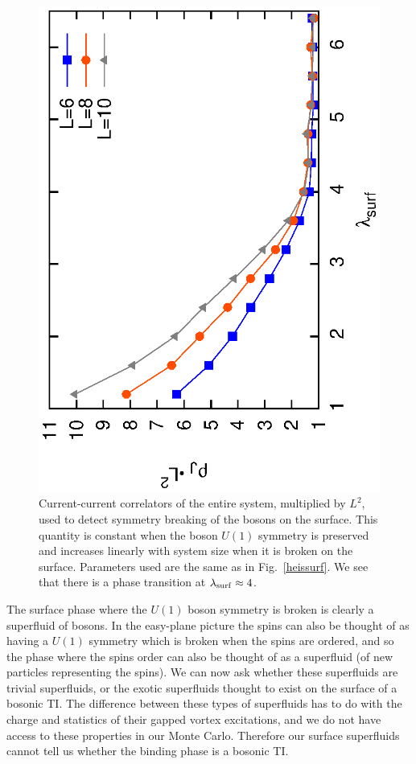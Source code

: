 \documentclass[prb,twocolumn]{revtex4-1}
\begin{document}
\begin{figure}
\includegraphics[angle=-90,width=\linewidth]{figures/slabcurs.eps}
\caption{Current-current correlators of the entire system, multiplied by $L^2$, used to detect symmetry breaking of the bosons on the surface. This quantity is constant when the boson $U(1)$ symmetry is preserved and increases linearly with system size when it is broken on the surface. Parameters used are the same as in Fig.~\ref{heissurf}. We see that there is a phase transition at $\lambda_{\rm surf}\approx 4$.
}
\label{slabcurs}
\end{figure} 


The surface phase where the $U(1)$ boson symmetry is broken is clearly a superfluid of bosons. In the easy-plane picture the spins can also be thought of as having a $U(1)$ symmetry which is broken when the spins are ordered, and so the phase where the spins order can also be thought of as a superfluid (of new particles representing the spins). We can now ask whether these superfluids are trivial superfluids, or the exotic superfluids thought to exist on the surface of a bosonic TI.\cite{SenthilVishwanath} The difference between these types of superfluids has to do with the charge and statistics of their gapped vortex excitations, and we do not have access to these properties in our Monte Carlo. Therefore our surface superfluids cannot tell us whether the binding phase is a bosonic TI.
\end{document}

